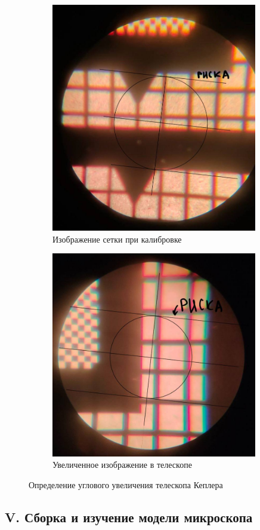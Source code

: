 \begin{figure}[h!]
    \centering
    \begin{subfigure}{0.45\linewidth}
        \centering
        \includegraphics[width=9cm]{images/calibrate.jpg}
        \caption{Изображение сетки при калибровке}
    \end{subfigure}
    \hfill
    \begin{subfigure}{0.45\linewidth}
        \centering
        \includegraphics[width=9cm]{images/kepler_image.jpg}
        \caption{Увеличенное изображение в телескопе}
    \end{subfigure}
    \caption{Определение углового увеличения телескопа Кеплера}
\end{figure}


\subsection*{V. Сборка и изучение модели микроскопа}

